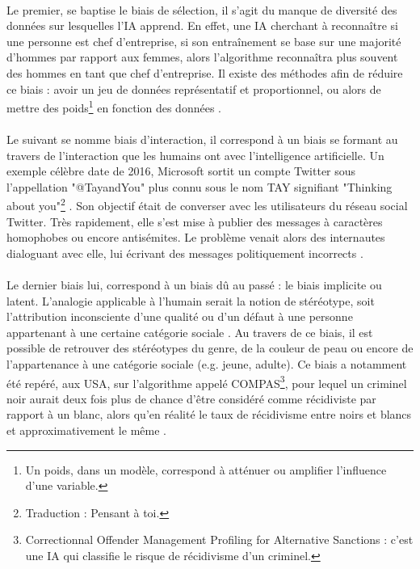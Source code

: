 \documentclass[10pt, french, a4paper]{report}
\begin{document}
\paragraph{}
Le premier, se baptise le biais de sélection, il s’agit du manque de diversité des données sur lesquelles l'IA apprend. En effet, une IA cherchant à reconnaître si une personne est chef d’entreprise, si son entraînement se base sur une majorité d’hommes par rapport aux femmes, alors l’algorithme reconnaîtra plus souvent des hommes en tant que chef d’entreprise. Il existe des méthodes afin de réduire ce biais : avoir un jeu de données représentatif et proportionnel, ou alors de mettre des poids\footnote{Un poids, dans un modèle, correspond à atténuer ou amplifier l'influence d'une variable.} en fonction des données \citep{tran_selection_2017}.

\paragraph{}
Le suivant se nomme biais d’interaction, il correspond à un biais se formant au travers de l’interaction que les humains ont avec l’intelligence artificielle. Un exemple célèbre date de 2016, Microsoft sortit un compte Twitter sous l’appellation "@TayandYou" plus connu sous le nom TAY signifiant "Thinking about you"\footnote{Traduction : Pensant à toi.} . Son objectif était de converser avec les utilisateurs du réseau social Twitter. Très rapidement, elle s’est mise à publier des messages à caractères homophobes ou encore antisémites. Le problème venait alors des internautes dialoguant avec elle, lui écrivant des messages politiquement incorrects \citep{tual_peine_2016}.

\paragraph{}
Le dernier biais lui, correspond à un biais dû au passé : le biais implicite ou latent. L’analogie applicable à l’humain serait la notion de stéréotype, soit l’attribution inconsciente d’une qualité ou d’un défaut à une personne appartenant à une certaine catégorie sociale \citep{greenwald_implicit_1995}. Au travers de ce biais, il est possible de retrouver des stéréotypes du genre, de la couleur de peau ou encore de l’appartenance à une catégorie sociale (e.g. jeune, adulte). Ce biais a notamment été repéré, aux USA, sur l’algorithme appelé COMPAS\footnote{Correctionnal Offender Management Profiling for Alternative Sanctions : c’est une IA qui classifie le risque de récidivisme d’un criminel.}, pour lequel un criminel noir aurait deux fois plus de chance d’être considéré comme récidiviste par rapport à un blanc, alors qu’en réalité le taux de récidivisme entre noirs et blancs et approximativement le même \citep{larson_how_2016}.
\end{document}
